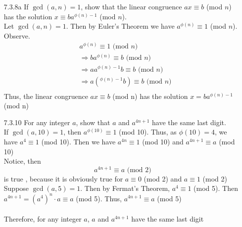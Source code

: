 \documentclass[12pt]{article}
\begin{document}
\begin{enumerate}
	\item[7.3.8a] If $ \gcd(a,n)=1 $, show that the linear congruence $ ax \equiv b$ (mod $ n $) has the solution $ x \equiv ba^{\phi(n)-1} $ (mod $ n $).\\
	Let $ \gcd(a,n)=1 $. Then by Euler's Theorem we have $ a^{\phi(n)} \equiv 1 $ (mod $n$). Observe. 
	\begin{align*}
		 &a^{\phi(n)}  \equiv 1 \text{ (mod $n$)}\\
		 &\Rightarrow ba^{\phi(n)} \equiv b \text{ (mod $n$)}\\
		 &\Rightarrow aa^{\phi(n)-1}b \equiv b \text{ (mod $n$)}\\
		 &\Rightarrow a(^{\phi(n)-1}b) \equiv b \text{ (mod $n$)}\\
	\end{align*}
	Thus, the linear congruence $ ax\equiv b $ (mod n) has the solution $ x=ba^{\phi(n)-1} $ (mod n)
	\item[7.3.10] For any integer $ a $, show that $ a $ and $ a^{4n+1} $ have the same last digit.
	\\
	If $ \gcd(a,10)=1 $, then $ a^{\phi(10)}\equiv1 $ (mod 10). Thus, as $ \phi(10) = 4$, we have $ a^4\equiv 1 $ (mod 10). Then we have $ a^{4n}\equiv 1 $ (mod 10) and $ a^{4n+1}\equiv a $ (mod 10) \\
	Notice, then
	 \[a^{4n+1}\equiv a\text{ (mod 2)}\]
	 	is true , because it is obviously true for $ a\equiv0 $ (mod 2) and $ a\equiv 1 $ (mod 2)
	\\
	Suppose $ \gcd(a,5) = 1$. Then by Fermat's Theorem, $ a^4\equiv 1 $ (mod 5). Then $ a^{4n+1}=(a^4)^n\cdot a \equiv a $ (mod 5). Thus, $ a^{4n+1}\equiv a $ (mod 5) \\
	\\
	Therefore, for any integer $ a $, $ a $ and $ a^{4n+1} $ have the same last digit
\end{enumerate}
\end{document}
